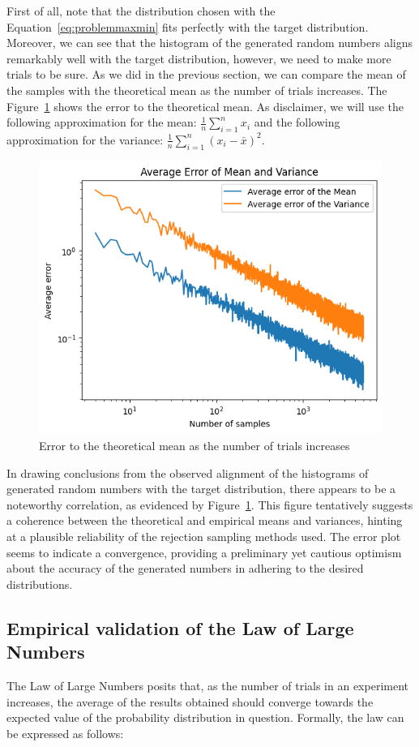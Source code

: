 \documentclass{article}
\begin{document}
First of all, note that the distribution chosen with the Equation~\ref{eq:problemmaxmin} fits perfectly with the target distribution. Moreover, we can see that the histogram of the generated random numbers aligns remarkably well with the target distribution, however, we need to make more trials to be sure. As we did in the previous section, we can compare the mean of the samples with the theoretical mean as the number of trials increases. The Figure~\ref{fig:rejectionerror} shows the error to the theoretical mean. As disclaimer, we will use the following approximation for the mean: \(\frac{1}{n}\sum_{i=1}^{n} x_i\) and the following approximation for the variance: \(\frac{1}{n}\sum_{i=1}^{n} (x_i - \bar{x})^2\).

\begin{figure}[H]
	\centering
	\includegraphics[width=0.5\linewidth]{./Figures/AcceptanceRejection/error_linear_regression.png}
	\caption{Error to the theoretical mean as the number of trials increases}
	\label{fig:rejectionerror}
\end{figure}

In drawing conclusions from the observed alignment of the histograms of generated random numbers with the target distribution, there appears to be a noteworthy correlation, as evidenced by Figure~\ref{fig:rejectionerror}. This figure tentatively suggests a coherence between the theoretical and empirical means and variances, hinting at a plausible reliability of the rejection sampling methods used. The error plot seems to indicate a convergence, providing a preliminary yet cautious optimism about the accuracy of the generated numbers in adhering to the desired distributions.

\subsection{Empirical validation of the Law of Large Numbers}
\label{sec:lln}

The Law of Large Numbers posits that, as the number of trials in an experiment increases, the average of the results obtained should converge towards the expected value of the probability distribution in question. Formally, the law can be expressed as follows:
\end{document}
